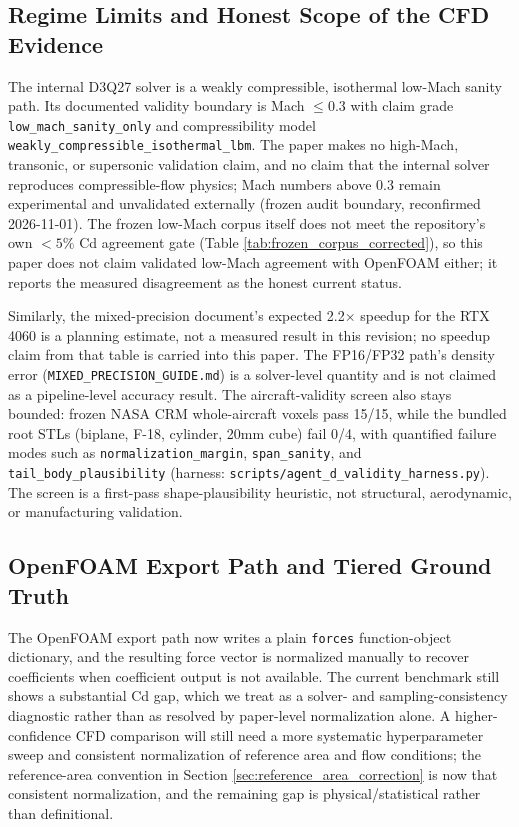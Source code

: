 \subsection{Regime Limits and Honest Scope of the CFD Evidence}
\label{sec:regime_limits}
The internal D3Q27 solver is a weakly compressible, isothermal low-Mach sanity path. Its documented validity boundary is Mach \(\leq 0.3\) with claim grade \texttt{low\_mach\_sanity\_only} and compressibility model \texttt{weakly\_compressible\_isothermal\_lbm}. The paper makes no high-Mach, transonic, or supersonic validation claim, and no claim that the internal solver reproduces compressible-flow physics; Mach numbers above 0.3 remain experimental and unvalidated externally (frozen audit boundary, reconfirmed 2026-11-01). The frozen low-Mach corpus itself does not meet the repository's own \(<5\%\) Cd agreement gate (Table \ref{tab:frozen_corpus_corrected}), so this paper does not claim validated low-Mach agreement with OpenFOAM either; it reports the measured disagreement as the honest current status.

Similarly, the mixed-precision document's expected 2.2\(\times\) speedup for the RTX 4060 is a planning estimate, not a measured result in this revision; no speedup claim from that table is carried into this paper. The FP16/FP32 path's density error (\texttt{MIXED\_PRECISION\_GUIDE.md}) is a solver-level quantity and is not claimed as a pipeline-level accuracy result. The aircraft-validity screen also stays bounded: frozen NASA CRM whole-aircraft voxels pass 15/15, while the bundled root STLs (biplane, F-18, cylinder, 20mm cube) fail 0/4, with quantified failure modes such as \texttt{normalization\_margin}, \texttt{span\_sanity}, and \texttt{tail\_body\_plausibility} (harness: \texttt{scripts/agent\_d\_validity\_harness.py}). The screen is a first-pass shape-plausibility heuristic, not structural, aerodynamic, or manufacturing validation.

\subsection{OpenFOAM Export Path and Tiered Ground Truth}
The OpenFOAM export path now writes a plain \texttt{forces} function-object dictionary, and the resulting force vector is normalized manually to recover coefficients when coefficient output is not available. The current benchmark still shows a substantial Cd gap, which we treat as a solver- and sampling-consistency diagnostic rather than as resolved by paper-level normalization alone. A higher-confidence CFD comparison will still need a more systematic hyperparameter sweep and consistent normalization of reference area and flow conditions; the reference-area convention in Section \ref{sec:reference_area_correction} is now that consistent normalization, and the remaining gap is physical/statistical rather than definitional.


